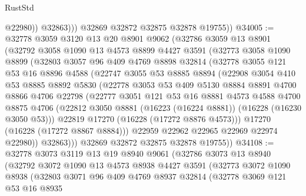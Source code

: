 \begin{lexlean}{RustStd}
\begin{coremodule}
                  @22980))
              @32863)))
        @32869
        @32872
        @32875
        @32878
        @19755))
@34005 := @32778
    @3059
    @3120
    @13
    @20
    @8901
    @9062
    (@32786
      @3059
      @13
      @8901
      (@32792
        @3058
        @1090
        @13
        @4573
        @8899
        @4427
        @3591
        (@32773
          @3058
          @1090
          @8899
          (@32803
            @3057
            @96
            @409
            @4769
            @8898
            @32814
            (@32778
              @3055
              @121
              @53
              @16
              @8896
              @4588
              (@22747
                @3055
                @53
                @8885
                @8894
                (@22908
                  @3054
                  @410
                  @53
                  @8885
                  @8892
                  @5830
                  (@22778
                    @3053
                    @53
                    @409
                    @5130
                    @8884
                    @8891
                    @4700
                    @8866
                    @4706
                    @22798
                    (@22777
                      @3051
                      @121
                      @53
                      @16
                      @8881
                      @4573
                      @4588
                      @4700
                      @8875
                      @4706
                      (@22812 @3050 @8881 (@16223 (@16224 @8881)) (@16228 (@16230 @3050 @53)))
                      @22819
                      @17270
                      (@16228 (@17272 @8876 @4573)))
                    @17270
                    (@16228 (@17272 @8867 @8884)))
                  @22959
                  @22962
                  @22965
                  @22969
                  @22974
                  @22980))
              @32863)))
        @32869
        @32872
        @32875
        @32878
        @19755))
@34108 := @32778
    @3073
    @3119
    @13
    @19
    @8940
    @9061
    (@32786
      @3073
      @13
      @8940
      (@32792
        @3072
        @1090
        @13
        @4573
        @8938
        @4427
        @3591
        (@32773
          @3072
          @1090
          @8938
          (@32803
            @3071
            @96
            @409
            @4769
            @8937
            @32814
            (@32778
              @3069
              @121
              @53
              @16
              @8935

\end{coremodule}
\end{lexlean}
